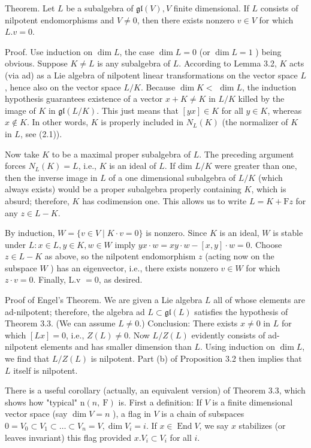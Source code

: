 \documentclass[10pt]{article}
\begin{document}
Theorem. Let $L$ be a subalgebra of $\mathfrak{g l}(V), V$ finite dimensional. If $L$ consists of nilpotent endomorphisms and $V \neq 0$, then there exists nonzero $v \in V$ for which $L . v=0$.

Proof. Use induction on $\operatorname{dim} L$, the case $\operatorname{dim} L=0$ (or $\operatorname{dim} L=1$ ) being obvious. Suppose $K \neq L$ is any subalgebra of $L$. According to Lemma 3.2, $K$ acts (via ad) as a Lie algebra of nilpotent linear transformations on the vector space $L$, hence also on the vector space $L / K$. Because $\operatorname{dim} K<$ $\operatorname{dim} L$, the induction hypothesis guarantees existence of a vector $x+K \neq K$ in $L / K$ killed by the image of $K$ in $\mathfrak{g l}(L / K)$. This just means that $[y x] \in K$ for all $y \in K$, whereas $x \notin K$. In other words, $K$ is properly included in $N_{L}(K)$ (the normalizer of $K$ in $L$, see (2.1)).

Now take $K$ to be a maximal proper subalgebra of $L$. The preceding argument forces $N_{L}(K)=L$, i.e., $K$ is an ideal of $L$. If dim $L / K$ were greater than one, then the inverse image in $L$ of a one dimensional subalgebra of $L / K$ (which always exists) would be a proper subalgebra properly containing $K$, which is absurd; therefore, $K$ has codimension one. This allows us to write $L=K+\mathrm{F} z$ for any $z \in L-K$.

By induction, $W=\{v \in V \mid K \cdot v=0\}$ is nonzero. Since $K$ is an ideal, $W$ is stable under $L: x \in L, y \in K, w \in W$ imply $y x \cdot w=x y \cdot w-[x, y] \cdot w=0$. Choose $z \in L-K$ as above, so the nilpotent endomorphism $z$ (acting now on the subspace $W$ ) has an eigenvector, i.e., there exists nonzero $v \in W$ for which $z \cdot v=0$. Finally, L.v $=0$, as desired.

Proof of Engel's Theorem. We are given a Lie algebra $L$ all of whose elements are ad-nilpotent; therefore, the algebra ad $L \subset \mathfrak{g l}(L)$ satisfies the hypothesis of Theorem 3.3. (We can assume $L \neq 0$.) Conclusion: There exists $x \neq 0$ in $L$ for which $[L x]=0$, i.e., $Z(L) \neq 0$. Now $L / Z(L)$ evidently consists of ad-nilpotent elements and has smaller dimension than $L$. Using induction on $\operatorname{dim} L$, we find that $L / Z(L)$ is nilpotent. Part (b) of Proposition 3.2 then implies that $L$ itself is nilpotent.

There is a useful corollary (actually, an equivalent version) of Theorem 3.3, which shows how "typical" $\mathrm{n}(n, \mathrm{~F})$ is. First a definition: If $V$ is a finite dimensional vector space (say $\operatorname{dim} V=n$ ), a flag in $V$ is a chain of subspaces $0=V_{0} \subset V_{1} \subset \ldots \subset V_{n}=V, \operatorname{dim} V_{i}=i$. If $x \in \operatorname{End} V$, we say $x$ stabilizes (or leaves invariant) this flag provided $x . V_{i} \subset V_{i}$ for all $i$.
\end{document}
